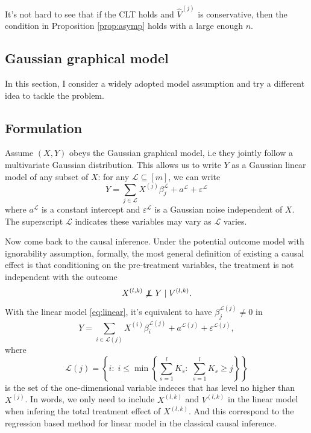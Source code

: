 \documentclass[11pt]{article}
\newcommand{\cL}{\mathcal{L}}
\newcommand\indpt{\protect\mathpalette{\protect\indpT}{\perp}}
\def\indpT#1#2{\mathrel{\rlap{$#1#2$}\mkern2mu{#1#2}}}
\newcommand{\ep}{\varepsilon}
\newcommand{\set}[1]{\left \{  #1 \right \}}
\begin{document}
It's not hard to see that if the CLT holds and $\hat V^{(j)}$ is conservative, then the condition in Proposition \ref{prop:asymp} holds with a large enough $n$.


\subsection{Gaussian graphical model}%
\label{sub:gaussian_graphical_model}

In this section, I consider a widely adopted model assumption and try a different idea to tackle the problem.

\subsection{Formulation}%
\label{sub:formulation}

Assume $(X, Y)$ obeys the Gaussian graphical model, i.e they jointly follow a multivariate Gaussian distribution. This allows us to write $Y$ as a Gaussian linear model of any subset of $X$: for any $\cL \subseteq [m]$, we can write
\begin{equation}\label{eq:linear}
    Y = \sum_{j \in \cL} X^{(j)} \beta_j^\cL + a^\cL + \ep^\cL
\end{equation}
where $a^\cL$ is a constant intercept and $\ep^\cL$ is a Gaussian noise independent of $X$. The superscript $\cL$ indicates these variables may vary as $\cL$ varies.

Now come back to the causal inference. Under the potential outcome model with ignorability assumption, formally, the most general definition of existing a causal effect is that conditioning on the pre-treatment variables, the treatment is not independent with the outcome
\[ X^{(l,k)} \not \indpt Y \mid V^{(l,k)}. \]
With the linear model \eqref{eq:linear}, it's equivalent to have $\beta^{\cL(j)}_j \neq 0$ in
\begin{equation} \label{eq:model}
    Y = \sum_{i \in \cL(j)} X^{(i)} \beta_i^{\cL(j)} + a^{\cL(j)} + \ep^{\cL(j)},
\end{equation}
where
\[ \cL(j) = \set{i: \; i \leq \min \set{\sum_{s=1}^l K_s: \; \sum_{s=1}^l K_s \geq j}} \]
is the set of the one-dimensional variable indeces that has level no higher than $X^{(j)}$. In words, we only need to include $X^{(l,k)}$ and $V^{(l,k)}$ in the linear model when infering the total treatment effect of $X^{(l,k)}$. And this correspond to the regression based method for linear model in the classical causal inference.
\end{document}
